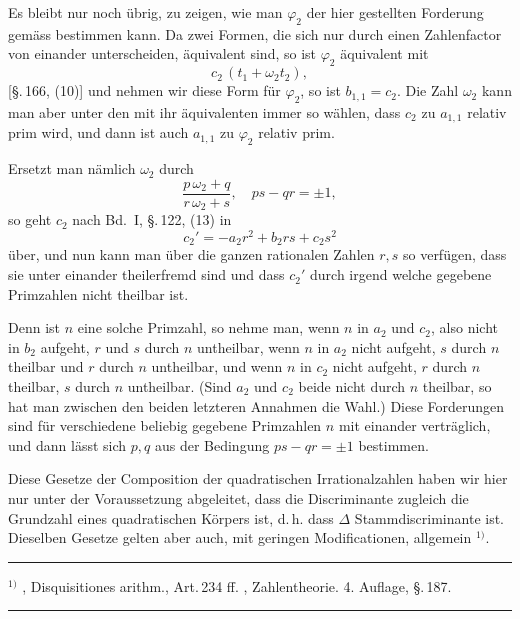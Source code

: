 
Es bleibt nur noch \"ubrig, zu zeigen, wie man $\varphi_2$ der hier gestellten Forderung gem\"ass bestimmen kann. Da zwei Formen, die sich nur durch einen Zahlenfactor von einander unterscheiden, \"aquivalent sind, so ist $\varphi_2$ \"aquivalent mit
\[
c_2\, (t_1 + \omega_2 t_2),
\]
[\S.\,166, (10)] und nehmen wir diese Form f\"ur $\varphi_2$, so ist $b_{1,1} = c_2$. Die Zahl $\omega_2$ kann man aber unter den mit ihr \"aquivalenten immer so w\"ahlen, dass $c_2$ zu $a_{1,1}$ relativ prim wird, und dann ist auch $a_{1,1}$ zu $\varphi_2$ relativ prim.

Ersetzt man n\"amlich $\omega_2$ durch
\[
\frac{p\, \omega_2 + q}{r\, \omega_2 + s}, \quad p s - q r = \pm 1,
\]
so geht $c_2$ nach Bd.\ I, \S.\,122, (13) in
\[
c_2' = -a_2 r^2 + b_2 r s + c_2 s^2
\]
\"uber, und nun kann man \"uber die ganzen rationalen Zahlen $r, s$ so verf\"ugen, dass sie unter einander theilerfremd sind und dass $c_2'$ durch irgend welche gegebene Primzahlen nicht theilbar ist.

Denn ist $n$ eine solche Primzahl, so nehme man, wenn $n$ in $a_2$ und $c_2$, also nicht in $b_2$ aufgeht, $r$ und $s$ durch $n$ untheilbar, wenn $n$ in $a_2$ nicht aufgeht, $s$ durch $n$ theilbar und $r$ durch $n$ untheilbar, und wenn $n$ in $c_2$ nicht aufgeht, $r$ durch $n$ theilbar, $s$ durch $n$ untheilbar. (Sind $a_2$ und $c_2$ beide nicht durch $n$ theilbar, so hat man zwischen den beiden letzteren Annahmen die Wahl.) Diese Forderungen sind f\"ur verschiedene beliebig gegebene Primzahlen $n$ mit einander vertr\"aglich, und dann l\"asst sich $p, q$ aus der Bedingung $p s - q r = \pm 1$ bestimmen.

Diese Gesetze der Composition der quadratischen Irrationalzahlen haben wir hier nur unter der Voraussetzung abgeleitet, dass die Discriminante zugleich die Grundzahl eines quadratischen K\"orpers ist, d.\,h. dass $\Delta$ Stammdiscriminante ist. Dieselben Gesetze gelten aber auch, mit geringen Modificationen, allgemein $^{1)}$.

\noindent\rule{4cm}{0.4pt}

$^{1)}$ , Disquisitiones arithm., Art.\,234 ff. , Zahlentheorie. 4. Auflage, \S.\,187.

\begin{center}
\rule{0.2\linewidth}{0.4pt}
\end{center}
